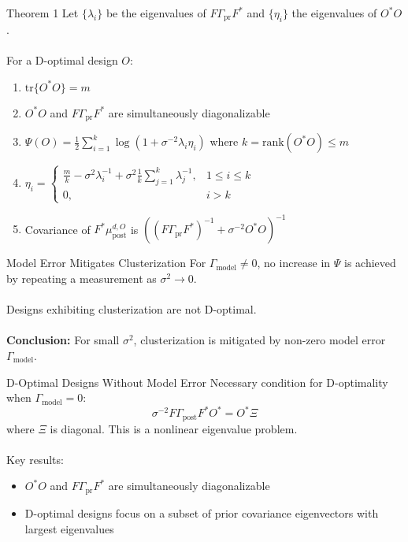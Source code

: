 \documentclass[aspectratio=169]{beamer}
\begin{document}
\begin{frame}{Theorem 1}
Let $\{\lambda_i\}$ be the eigenvalues of $F\Gamma_\text{pr}F^*$ and $\{\eta_i\}$ the eigenvalues of $O^*O$. \\~\\
For a D-optimal design $O$: 
\begin{enumerate}
    \item $\text{tr}\{O^*O\} = m$
    \item $O^*O$ and $F\Gamma_\text{pr}F^*$ are simultaneously diagonalizable
    \item $\Psi(O) = \frac{1}{2} \sum_{i=1}^k \log(1 + \sigma^{-2}\lambda_i\eta_i)$ where $k=\text{rank}(O^*O) \leq m$
    \item $\eta_i = \begin{cases} 
          \frac{m}{k} - \sigma^2\lambda_i^{-1} + \sigma^2\frac{1}{k}\sum_{j=1}^k \lambda_j^{-1}, & 1 \leq i \leq k \\
          0, & i > k
       \end{cases}$
    \item Covariance of $F^*\mu_\text{post}^{d,O}$ is $\left((F\Gamma_\text{pr}F^*)^{-1} + \sigma^{-2}O^*O\right)^{-1}$ 
\end{enumerate}
\end{frame}

\begin{frame}{Model Error Mitigates Clusterization}
For $\Gamma_\text{model} \neq 0$, no increase in $\Psi$ is achieved by repeating a measurement as $\sigma^2 \to 0$. \\~\\
Designs exhibiting clusterization are not D-optimal.\\~\\
\textbf{Conclusion:} For small $\sigma^2$, clusterization is mitigated by non-zero model error $\Gamma_\text{model}$.
\end{frame}

\begin{frame}{D-Optimal Designs Without Model Error}
Necessary condition for D-optimality when $\Gamma_\text{model}=0$:
\begin{equation*}
    \sigma^{-2}F\Gamma_\text{post}F^*O^* = O^*\Xi
\end{equation*}
where $\Xi$ is diagonal. This is a nonlinear eigenvalue problem.\\~\\
Key results:
\begin{itemize}
    \item $O^*O$ and $F\Gamma_\text{pr}F^*$ are simultaneously diagonalizable
    \item D-optimal designs focus on a subset of prior covariance eigenvectors with largest eigenvalues
\end{itemize}
\end{frame}
\end{document}

